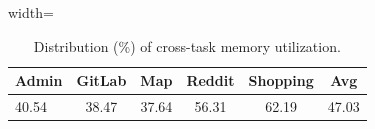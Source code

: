 

\begin{table}[t]
\vspace{-4mm}
  \caption{Distribution (\%) of cross-task memory utilization.}
  \label{tab:memory_utilization}
  \begin{center}
    \begin{small}
      \begin{adjustbox}{width=\columnwidth}
      \vspace{-6mm}
        \begin{tabular}{lccccc}
          \toprule
          \textbf{Admin} & \textbf{GitLab} & \textbf{Map} & \textbf{Reddit} & \textbf{Shopping} & \textbf{Avg} \\
          \midrule
          40.54 & 38.47 & 37.64 & 56.31 & 62.19 & 47.03 \\
          \bottomrule
        \end{tabular}
      \end{adjustbox}
    \end{small}
  \end{center}
  \vspace{-4mm}
\end{table}

